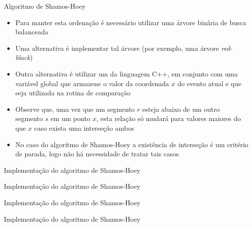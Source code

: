 \begin{frame}[fragile]{Algoritmo de Shamos-Hoey}

    \begin{itemize}
        \item Para manter esta ordenação é necessário utilizar uma árvore binária de busca
            balanceada

        \item Uma alternativa é implementar tal árvore (por exemplo, uma árvore \textit{red-black})

        \item Outra alternativa é utilizar um  da linguagem C++, em conjunto com
            uma variável global que armazene o valor da coordenada $x$ do evento atual e que
            seja utilizada na rotina de comparação

        \item Observe que, uma vez que um segmento $r$ esteja abaixo de um outro segmento $s$ 
            em um ponto $x$, esta relação só mudará para valores maiores do que $x$ 
            caso exista uma interseção ambos

        \item No caso do algoritmo de Shamos-Hoey a existência de interseção é um critério
            de parada, logo não há necessidade de tratar tais casos 
    \end{itemize}

\end{frame}



\begin{frame}[fragile]{Implementação do algoritmo de Shamos-Hoey}
\end{frame}

\begin{frame}[fragile]{Implementação do algoritmo de Shamos-Hoey}
\end{frame}

\begin{frame}[fragile]{Implementação do algoritmo de Shamos-Hoey}
\end{frame}

\begin{frame}[fragile]{Implementação do algoritmo de Shamos-Hoey}
\end{frame}


